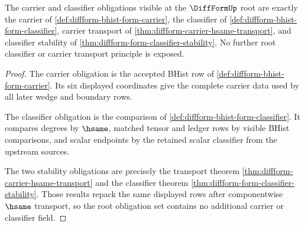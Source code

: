\begin{theorem}
\label{thm:diffform-root-carrier-classifier-obligation}
The carrier and classifier obligations visible at the $\DiffFormUp$ root are
exactly the carrier of \autoref{def:diffform-bhist-form-carrier}, the
classifier of \autoref{def:diffform-bhist-form-classifier}, carrier transport
of \autoref{thm:diffform-carrier-hsame-transport}, and classifier stability
of \autoref{thm:diffform-form-classifier-stability}. No further root
classifier or carrier transport principle is exposed.
\end{theorem}
\begin{proof}
The carrier obligation is the accepted BHist row of
\autoref{def:diffform-bhist-form-carrier}. Its six displayed coordinates give
the complete carrier data used by all later wedge and boundary rows.

The classifier obligation is the comparison of
\autoref{def:diffform-bhist-form-classifier}. It compares degrees by
$\hsame$, matched tensor and ledger rows by visible BHist comparisons, and
scalar endpoints by the retained scalar classifier from the upstream sources.

The two stability obligations are precisely the transport theorem
\autoref{thm:diffform-carrier-hsame-transport} and the classifier theorem
\autoref{thm:diffform-form-classifier-stability}. Those results repack the
same displayed rows after componentwise $\hsame$ transport, so the root
obligation set contains no additional carrier or classifier field.
\end{proof}

